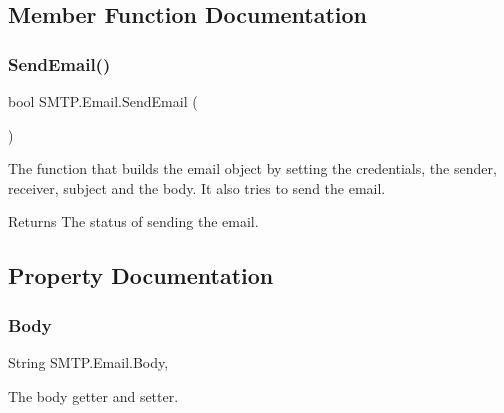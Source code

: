 \subsection{Member Function Documentation}
\mbox{\label{class_s_m_t_p_1_1_email_a8a4cd09a91979f79166cfb556f7f854a}} 
\subsubsection{\texorpdfstring{Send\+Email()}{SendEmail()}}
{\footnotesize\ttfamily bool S\+M\+T\+P.\+Email.\+Send\+Email (\begin{DoxyParamCaption}{ }\end{DoxyParamCaption})}



The function that builds the email object by setting the credentials, the sender, receiver, subject and the body. It also tries to send the email. 

\begin{DoxyReturn}{Returns}
The status of sending the email.
\end{DoxyReturn}


\subsection{Property Documentation}
\mbox{\label{class_s_m_t_p_1_1_email_a8086606e0815e9c3bcfe173b56853b41}} 
\subsubsection{\texorpdfstring{Body}{Body}}
{\footnotesize\ttfamily String S\+M\+T\+P.\+Email.\+Body\hspace{0.3cm}{\ttfamily [get]}, {\ttfamily [set]}}



The body getter and setter. 

\mbox{\label{class_s_m_t_p_1_1_email_a3d0bce9a0c0087a3c62e461476367cbb}} 
